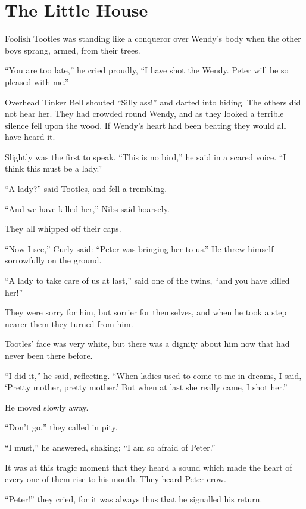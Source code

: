 
\chapter{The Little House}

Foolish Tootles was standing like a conqueror over Wendy’s body
when the other boys sprang, armed, from their trees.

“You are too late,” he cried proudly, “I have shot the Wendy.
Peter will be so pleased with me.”

Overhead Tinker Bell shouted “Silly ass!\@” and darted into hiding.
The others did not hear her.
They had crowded round Wendy, and as they looked a terrible silence fell upon the wood.
If Wendy’s heart had been beating they would all have heard it.

Slightly was the first to speak.
“This is no bird,” he said in a scared voice.
“I think this must be a lady.”

“A lady?\@” said Tootles, and fell a-trembling.

“And we have killed her,” Nibs said hoarsely.

They all whipped off their caps.

“Now I see,” Curly said:
“Peter was bringing her to us.”
He threw himself sorrowfully on the ground.

“A lady to take care of us at last,” said one of the twins,
“and you have killed her!”

They were sorry for him, but sorrier for themselves,
and when he took a step nearer them they turned from him.

Tootles’ face was very white, but there was a dignity about him now that had never been there before.

“I did it,” he said, reflecting.
“When ladies used to come to me in dreams,
I said, ‘Pretty mother, pretty mother.’
But when at last she really came, I shot her.”

He moved slowly away.

“Don’t go,” they called in pity.

“I must,” he answered, shaking;
“I am so afraid of Peter.”

It was at this tragic moment that they heard a sound which made the heart of every one of them rise to his mouth.
They heard Peter crow.

“Peter!\@” they cried, for it was always thus that he signalled his return.


